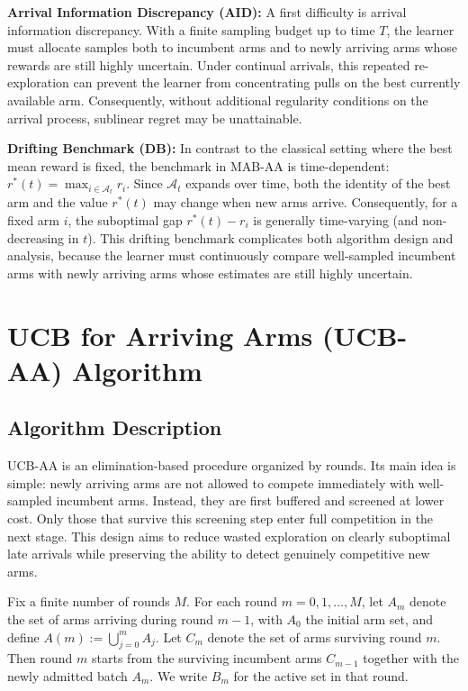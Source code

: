 \documentclass[11pt]{article}
\begin{document}
\textbf{Arrival Information Discrepancy (AID):}
A first difficulty is arrival information discrepancy. With a finite sampling budget up to time $T$, the learner must allocate samples both to incumbent arms and to newly arriving arms whose rewards are still highly uncertain. Under continual arrivals, this repeated re-exploration can prevent the learner from concentrating pulls on the best currently available arm. Consequently, without additional regularity conditions on the arrival process, sublinear regret may be unattainable.

\textbf{Drifting Benchmark (DB):}
In contrast to the classical setting where the best mean reward is fixed, the benchmark in MAB-AA is time-dependent: $r^*(t)=\max_{i\in \mathcal{A}_t} r_i$. Since $\mathcal{A}_t$ expands over time, both the identity of the best arm and the value $r^*(t)$ may change when new arms arrive. Consequently, for a fixed arm $i$, the suboptimal gap $r^*(t)-r_i$ is generally time-varying (and non-decreasing in $t$). This drifting benchmark complicates both algorithm design and analysis, because the learner must continuously compare well-sampled incumbent arms with newly arriving arms whose estimates are still highly uncertain.


\section{UCB for Arriving Arms (UCB-AA) Algorithm}
\label{sec:algorithm}



\subsection{Algorithm Description}



UCB-AA is an elimination-based procedure organized by rounds. Its main idea is simple:
newly arriving arms are not allowed to compete immediately with well-sampled incumbent
arms. Instead, they are first buffered and screened at lower cost. Only those that survive
this screening step enter full competition in the next stage. This design aims to reduce
wasted exploration on clearly suboptimal late arrivals while preserving the ability to detect
genuinely competitive new arms.

Fix a finite number of rounds \(M\). For each round \(m=0,1,\dots,M\), let \(A_m\) denote
the set of arms arriving during round \(m-1\), with \(A_0\) the initial arm set, and define
\(
A(m):=\bigcup_{j=0}^m A_j .
\)
Let \(C_m\) denote the set of arms surviving round \(m\). Then round \(m\) starts from the
surviving incumbent arms \(C_{m-1}\) together with the newly admitted batch \(A_m\).
We write \(B_m\) for the active set in that round.
\end{document}
